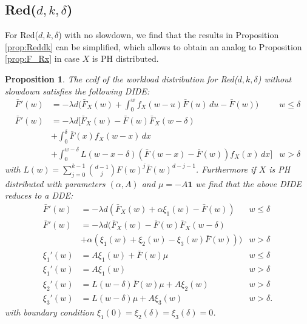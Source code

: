 \documentclass[12pt]{report}
\newtheorem{proposition}[theorem]{Proposition}
\begin{document}
\subsection{Red($d,k,\delta$)} \label{sec:Red_identical}
For Red($d,k,\delta$) with no slowdown, we find that the results in Proposition \ref{prop:Reddk} can be simplified, which allows to obtain an analog to Proposition \ref{prop:F_Rx} in case $X$ is PH distributed.
\begin{proposition} \label{prop:Reddk_identical}
	The ccdf of the workload distribution for Red($d,k,\delta$) without slowdown satisfies the following DIDE:
	\begin{align}
		\bar F'(w) &= -\lambda d \bigg( \bar F_X(w) + \int_0^w f_X(w-u) \bar F(u) \, du - \bar F(w) \bigg)  & w \leq \delta \label{eq:Fbar_Reddk_1}\\
		\bar F'(w) &= - \lambda d \bigg[ \bar F_X(w) - \bar F(w) \bar F_X(w-\delta) \\
		&+ \int_0^{\delta} \bar F(x) f_X(w-x) \, dx & \nonumber\\
		&+ \int_0^{w-\delta} L(w-x-\delta) (\bar F(w-x) - \bar F(w)) f_X(x) \, dx \bigg]  & w > \delta \label{eq:Fbar_Reddk_2}
	\end{align}
	with $L(w)= \sum_{j=0}^{k-1} \binom{d-1}{j} F(w)^j \bar F(w)^{d-j-1}$. Furthermore if $X$ is PH distributed with parameters $(\alpha, A)$ and $\mu = -A \textbf{1}$ we find that the above DIDE reduces to a DDE:
	\begin{align*}
		\bar F' (w)
		&= -\lambda d \left( \bar F_X(w) + \alpha \xi_1(w) - \bar F(w) \right) & w \leq \delta\\
		\bar F'(w)&=-\lambda d \bigg( \bar F_X(w)- \bar F(w) \bar F_X(w-\delta)\\
		& + \alpha \left(\xi_1(w) + \xi_2(w) - \xi_3(w) \bar F(w) \right) \bigg) & w > \delta\\
		\xi_1'(w) &= A \xi_1(w) + \bar F(w) \mu & w \leq \delta\\
		\xi_1'(w) &= A \xi_1(w) & w>\delta\\
		\xi_2'(w) &= L(w-\delta) \bar F(w) \mu + A\xi_2(w) & w > \delta\\
		\xi_3'(w) &= L(w-\delta) \mu + A \xi_3(w) & w > \delta.
	\end{align*}
	with boundary condition $\xi_1(0) = \xi_2(\delta)=\xi_3(\delta)=0$.
\end{proposition}
\end{document}
